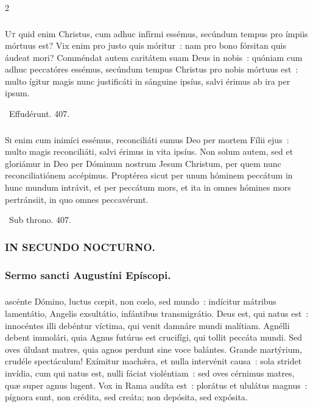 \documentclass[9pt,twoside]{extarticle}
\begin{document}
\begin{multicols}{2}
\subsubsection*{\center {}}
\lettrine{U}t quid enim Christus, cum adhuc infírmi essémus, secúndum tempus pro ímpiis mórtuus est?
Vix enim pro justo quis móritur~: nam pro bono fórsitan quis áudeat mori?
Comméndat autem caritátem suam Deus in nobis~: quóniam cum adhuc peccatóres essémus, secúndum tempus
Christus pro nobis mórtuus est~: multo ígitur magis nunc justificáti in sánguine ipsíus, salvi érimus ab ira per ipsum.

\begin{tightlist}{}
\item {}~Effudérunt. 407.
\end{tightlist}

\subsubsection*{\center {}}
\lettrine{S}i enim cum inimíci essémus, reconciliáti sumus Deo per mortem Fílii ejus~: multo magis reconciliáti, salvi érimus in vita ipsíus.
Non solum autem, sed et gloriámur in Deo per Dóminum nostrum Jesum Christum, per quem nunc reconciliatiónem accépimus.
Proptérea sicut per unum hóminem peccátum in hunc mundum intrávit, et per peccátum mors, et ita in omnes hómines mors pertránsiit, in quo omnes peccavérunt.

\begin{tightlist}{}
\item {}~Sub throno. 407.
\end{tightlist}

\subsubsection*{\center \textsc{IN SECUNDO NOCTURNO.}}
\subsubsection*{\center Sermo sancti Augustíni Epíscopi.}
\subsubsection*{\center {}}
ascénte Dómino, luctus cœpit, non cœlo, sed mundo~: indícitur mátribus lamentátio, Angelis exsultátio, infántibus transmigrátio. Deus est, qui natus est~: innocéntes illi debéntur víctima, qui venit damnáre mundi malítiam. Agnélli debent immolári, quia Agnus futúrus est crucifígi, qui tollit peccáta mundi. Sed oves úlulant matres, quia agnos perdunt sine voce balántes. Grande martýrium, crudéle spectáculum! Exímitur machǽra, et nulla intervénit causa~: sola stridet invídia, cum qui natus est, nulli fáciat violéntiam~: sed oves cérnimus matres, quæ super agnus lugent. Vox in Rama audíta est~: plorátus et ululátus magnus~: pígnora sunt, non crédita, sed creáta; non depósita, sed expósita.


\end{multicols}
\end{document}
